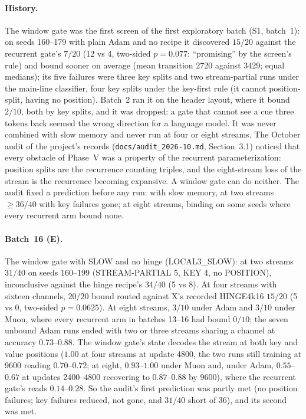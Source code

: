 \documentclass[11pt]{article}
\newcommand{\arm}[1]{\textsf{#1}}
\begin{document}
\paragraph{History.} The window gate was the first screen of the first exploratory batch (S1, batch~1): on seeds 160--179 with plain Adam and no recipe it discovered $15/20$ against the recurrent gate's $7/20$ (12 vs 4, two-sided $p = 0.077$: ``promising'' by the screen's rule) and bound sooner on average (mean transition 2720 against 3429; equal medians); its five failures were three key splits and two stream-partial runs under the main-line classifier, four key splits under the key-first rule (it cannot position-split, having no position). Batch~2 ran it on the header layout, where it bound $2/10$, both by key splits, and it was dropped: a gate that cannot see a cue three tokens back seemed the wrong direction for a language model. It was never combined with slow memory and never run at four or eight streams. The October audit of the project's records (\texttt{docs/audit\_2026-10.md}, Section~3.1) noticed that every obstacle of Phase~V was a property of the recurrent parameterization: position splits are the recurrence counting triples, and the eight-stream loss of the stream is the recurrence becoming expansive. A window gate can do neither. The audit fixed a prediction before any run: with slow memory, at two streams $\geq 36/40$ with key failures gone; at eight streams, binding on some seeds where every recurrent arm bound none.

\paragraph{Batch~16 (E).} The window gate with SLOW and no hinge (\arm{LOCAL3\_SLOW}): at two streams $31/40$ on seeds 160--199 (STREAM-PARTIAL 5, KEY 4, no POSITION), inconclusive against the hinge recipe's $34/40$ (5 vs 8). At four streams with sixteen channels, $20/20$ bound routed against X's recorded \arm{HINGE4k16} $15/20$ (5 vs 0, two-sided $p = 0.0625$). At eight streams, $3/10$ under Adam and $3/10$ under Muon, where every recurrent arm in batches 13--16 had bound $0/10$; the seven unbound Adam runs ended with two or three streams sharing a channel at accuracy $0.73$--$0.88$. The window gate's state decodes the stream at both key and value positions ($1.00$ at four streams at update 4800, the two runs still training at 9600 reading $0.70$--$0.72$; at eight, $0.93$--$1.00$ under Muon and, under Adam, $0.55$--$0.67$ at updates 2400--4800 recovering to $0.87$--$0.88$ by 9600), where the recurrent gate's reads $0.14$--$0.28$. So the audit's first prediction was partly met (no position failures; key failures reduced, not gone, and $31/40$ short of 36), and its second was met.
\end{document}
